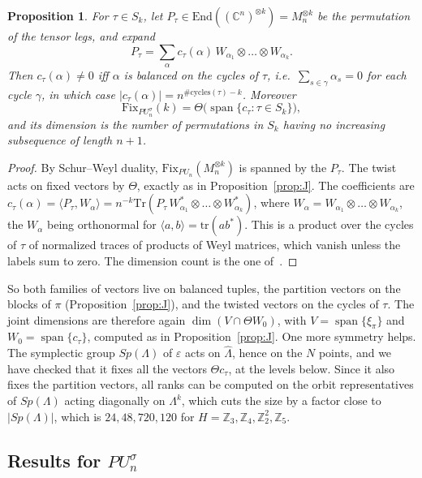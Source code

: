 \documentclass[11pt]{amsart}
\newtheorem{proposition}[theorem]{Proposition}
\theoremstyle{definition}
\theoremstyle{remark}
\theoremstyle{plain}
\numberwithin{equation}{section}
\numberwithin{table}{section}
\newcommand{\C}{\mathbb C}
\newcommand{\Z}{\mathbb Z}
\newcommand{\Fix}{\mathrm{Fix}}
\DeclareMathOperator{\spn}{span}
\begin{document}
\begin{proposition}\label{prop:pufix}
For $\tau\in S_k$, let $P_\tau\in\mathrm{End}((\C^n)^{\otimes k})=M_n^{\otimes k}$ be the permutation of the tensor legs, and expand
\[
P_\tau=\sum_\alpha c_\tau(\alpha)\,W_{\alpha_1}\otimes\dots\otimes W_{\alpha_k}.
\]
Then $c_\tau(\alpha)\ne0$ iff $\alpha$ is balanced on the cycles of $\tau$, i.e.\ $\sum_{s\in\gamma}\alpha_s=0$ for each cycle $\gamma$, in which case $|c_\tau(\alpha)|=n^{\#\mathrm{cycles}(\tau)-k}$. Moreover
\[
\Fix_{PU_n^\sigma}(k)=\Theta\big(\spn\{c_\tau:\tau\in S_k\}\big),
\]
and its dimension is the number of permutations in $S_k$ having no increasing subsequence of length $n+1$.
\end{proposition}

\begin{proof}
By Schur--Weyl duality, $\Fix_{PU_n}(M_n^{\otimes k})$ is spanned by the $P_\tau$. The twist acts on fixed vectors by $\Theta$, exactly as in Proposition~\ref{prop:J}. The coefficients are $c_\tau(\alpha)=\langle P_\tau,W_\alpha\rangle=n^{-k}\mathrm{Tr}(P_\tau\,W_{\alpha_1}^*\otimes\dots\otimes W_{\alpha_k}^*)$, where $W_\alpha=W_{\alpha_1}\otimes\dots\otimes W_{\alpha_k}$, the $W_\alpha$ being orthonormal for $\langle a,b\rangle=\mathrm{tr}(ab^*)$. This is a product over the cycles of $\tau$ of normalized traces of products of Weyl matrices, which vanish unless the labels sum to zero. The dimension count is the one of~\cite[Sec.~4]{bn}.
\end{proof}

So both families of vectors live on balanced tuples, the partition vectors on the blocks of $\pi$ (Proposition~\ref{prop:J}), and the twisted vectors on the cycles of $\tau$. The joint dimensions are therefore again $\dim(V\cap\Theta W_0)$, with $V=\spn\{\xi_\pi\}$ and $W_0=\spn\{c_\tau\}$, computed as in Proposition~\ref{prop:J}. One more symmetry helps. The symplectic group $Sp(\Lambda)$ of $\varepsilon$ acts on $\widehat\Lambda$, hence on the $N$ points, and we have checked that it fixes all the vectors $\Theta c_\tau$, at the levels below. Since it also fixes the partition vectors, all ranks can be computed on the orbit representatives of $Sp(\Lambda)$ acting diagonally on $\Lambda^k$, which cuts the size by a factor close to $|Sp(\Lambda)|$, which is $24,48,720,120$ for $H=\Z_3,\Z_4,\Z_2^2,\Z_5$.

\subsection{Results for \texorpdfstring{$PU_n^\sigma$}{PUn sigma}}\label{sec:pures}
\end{document}
